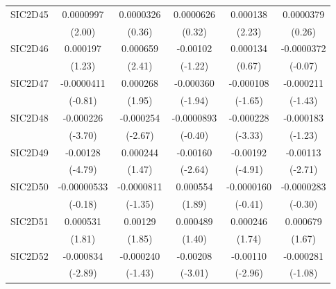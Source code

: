 \begin{table}[htbp]
\begin{tabular}{l*{5}{c}}
SIC2D45     &   0.0000997\sym{*}  &   0.0000326         &   0.0000626         &    0.000138\sym{*}  &   0.0000379         \\
            &      (2.00)         &      (0.36)         &      (0.32)         &      (2.23)         &      (0.26)         \\
SIC2D46     &    0.000197         &    0.000659\sym{*}  &    -0.00102         &    0.000134         &  -0.0000372         \\
            &      (1.23)         &      (2.41)         &     (-1.22)         &      (0.67)         &     (-0.07)         \\
SIC2D47     &  -0.0000411         &    0.000268         &   -0.000360         &   -0.000108         &   -0.000211         \\
            &     (-0.81)         &      (1.95)         &     (-1.94)         &     (-1.65)         &     (-1.43)         \\
SIC2D48     &   -0.000226\sym{***}&   -0.000254\sym{**} &  -0.0000893         &   -0.000228\sym{***}&   -0.000183         \\
            &     (-3.70)         &     (-2.67)         &     (-0.40)         &     (-3.33)         &     (-1.23)         \\
SIC2D49     &    -0.00128\sym{***}&    0.000244         &    -0.00160\sym{**} &    -0.00192\sym{***}&    -0.00113\sym{**} \\
            &     (-4.79)         &      (1.47)         &     (-2.64)         &     (-4.91)         &     (-2.71)         \\
SIC2D50     & -0.00000533         &  -0.0000811         &    0.000554         &  -0.0000160         &  -0.0000283         \\
            &     (-0.18)         &     (-1.35)         &      (1.89)         &     (-0.41)         &     (-0.30)         \\
SIC2D51     &    0.000531         &     0.00129         &    0.000489         &    0.000246         &    0.000679         \\
            &      (1.81)         &      (1.85)         &      (1.40)         &      (1.74)         &      (1.67)         \\
SIC2D52     &   -0.000834\sym{**} &   -0.000240         &    -0.00208\sym{**} &    -0.00110\sym{**} &   -0.000281         \\
            &     (-2.89)         &     (-1.43)         &     (-3.01)         &     (-2.96)         &     (-1.08)         \\

\end{tabular}
\end{table}
